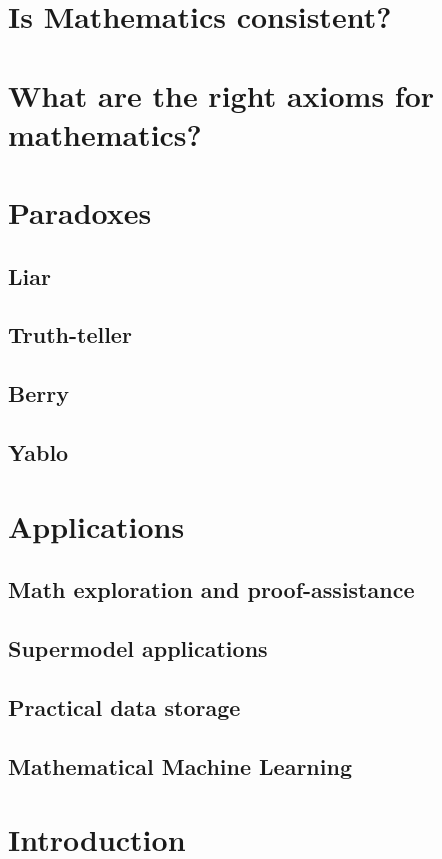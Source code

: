 \documentclass[12pt]{article}
\begin{document}
\section{Is Mathematics consistent?}
\section{What are the right axioms for mathematics?}
\section{Paradoxes} 
\subsection{Liar}
\subsection{Truth-teller} 
\subsection{Berry}
\subsection{Yablo}
\section{Applications} 
\subsection{Math exploration and proof-assistance}
\subsection{Supermodel applications}
\subsection{Practical data storage} 
\subsection{Mathematical Machine Learning} 

\section{Introduction}
\end{document}
